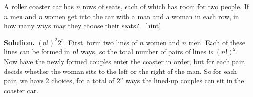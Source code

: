 \documentclass{book}
\begin{document}
\setcounter{project}{87}
\addtocounter{project}{-1}
\begin{activity}[]\label{activity-80}
\hypertarget{p-679}{}%
A roller coaster car has \(n\) rows of seats, each of which has room for two people. If \(n\) men and \(n\) women get into the car with a man and a woman in each row, in how many ways may they choose their seats?%
~\hfill{\tiny\hyperlink{a-87}{[hint]}\hypertarget{q-87}{}}\par\smallskip%
\noindent\textbf{Solution.}\hypertarget{solution-64}{}\quad%
\hypertarget{p-681}{}%
\((n!)^2 2^n\).  First, form two lines of \(n\) women and \(n\) men.  Each of these lines can be formed in \(n!\) ways, so the total number of pairs of lines is \((n!)^2\).  Now have the newly formed couples enter the coaster in order, but for each pair, decide whether the woman sits to the left or the right of the man.  So for each pair, we have 2 choices, for a total of \(2^n\) ways the lined-up couples can sit in the coaster car.%
\end{activity}
\end{document}
